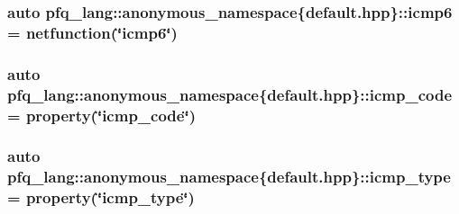 \hypertarget{namespacepfq__lang_1_1anonymous__namespace_02default_8hpp_03_ab1e01b177ae34e48f61eed78580aeac0}{
\subsubsection[{icmp6}]{\setlength{\rightskip}{0pt plus 5cm}auto pfq\+\_\+lang\+::anonymous\+\_\+namespace\{default.\+hpp\}\+::icmp6 = {\bf netfunction}(\char`\"{}icmp6\char`\"{})}}\label{namespacepfq__lang_1_1anonymous__namespace_02default_8hpp_03_ab1e01b177ae34e48f61eed78580aeac0}
\hypertarget{namespacepfq__lang_1_1anonymous__namespace_02default_8hpp_03_aad0f666aca065f5aaf283857e5c933ce}{
\subsubsection[{icmp\+\_\+code}]{\setlength{\rightskip}{0pt plus 5cm}auto pfq\+\_\+lang\+::anonymous\+\_\+namespace\{default.\+hpp\}\+::icmp\+\_\+code = {\bf property}(\char`\"{}icmp\+\_\+code\char`\"{})}}\label{namespacepfq__lang_1_1anonymous__namespace_02default_8hpp_03_aad0f666aca065f5aaf283857e5c933ce}
\hypertarget{namespacepfq__lang_1_1anonymous__namespace_02default_8hpp_03_a4adff7ced08caa2d0016a911dae6d2ed}{
\subsubsection[{icmp\+\_\+type}]{\setlength{\rightskip}{0pt plus 5cm}auto pfq\+\_\+lang\+::anonymous\+\_\+namespace\{default.\+hpp\}\+::icmp\+\_\+type = {\bf property}(\char`\"{}icmp\+\_\+type\char`\"{})}}\label{namespacepfq__lang_1_1anonymous__namespace_02default_8hpp_03_a4adff7ced08caa2d0016a911dae6d2ed}
